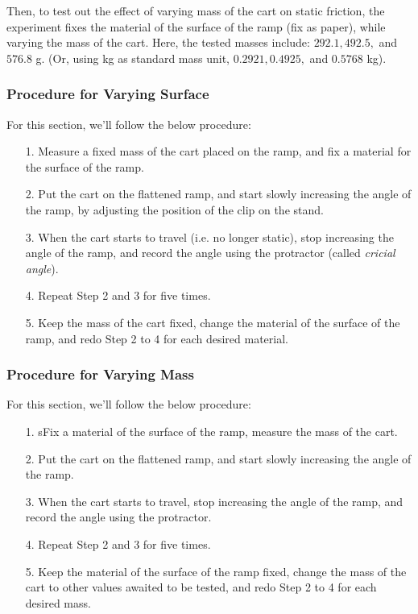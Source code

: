 \documentclass{article}
\begin{document}
Then, to test out the effect of varying mass of the cart on static friction, the experiment fixes the material of the surface of the ramp (fix as paper), while varying the mass of the cart. Here, the tested masses include: $292.1, 492.5,$ and $576.8$ g. (Or, using kg as standard mass unit, $0.2921, 0.4925,$ and $0.5768$ kg).

\hfil

\subsubsection{Procedure for Varying Surface}
For this section, we'll follow the below procedure:
\begin{itemize}
    \item[1.] Measure a fixed mass of the cart placed on the ramp, and fix a material for the surface of the ramp.
    \item[2.] Put the cart on the flattened ramp, and start slowly increasing the angle of the ramp, by adjusting the position of the clip on the stand.
    \item[3.] When the cart starts to travel (i.e. no longer static), stop increasing the angle of the ramp, and record the angle using the protractor (called \emph{cricial angle}).
    \item[4.] Repeat Step 2 and 3 for five times.
    \item[5.] Keep the mass of the cart fixed, change the material of the surface of the ramp, and redo Step 2 to 4 for each desired material. 
\end{itemize}

\hfil

\subsubsection{Procedure for Varying Mass}
For this section, we'll follow the below procedure:
\begin{itemize}
    \item[1.] sFix a material of the surface of the ramp, measure the mass of the cart.
    \item[2.] Put the cart on the flattened ramp, and start slowly increasing the angle of the ramp. 
    \item[3.] When the cart starts to travel, stop increasing the angle of the ramp, and record the angle using the protractor.
    \item[4.] Repeat Step 2 and 3 for five times.
    \item[5.] Keep the material of the surface of the ramp fixed, change the mass of the cart to other values awaited to be tested, and redo Step 2 to 4 for each desired mass.  
\end{itemize}
\end{document}

